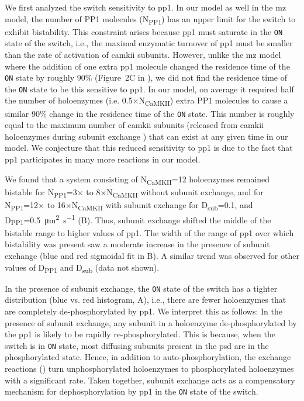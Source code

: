 \documentclass[9pt,lineno,doublespacing]{elife}
\newcommand\SUB[2]{#1\textsubscript{#2}}
\begin{document}
We first analyzed the switch sensitivity to \gls{pp1}. In our model as well in
the \gls{mz} model, the number of PP1 molecules (\SUB{N}{PP1}) has an upper
limit for the switch to exhibit bistability. This constraint arises because
\gls{pp1} must saturate in the \texttt{ON} state of the switch, i.e., the
maximal enzymatic turnover of \gls{pp1} must be smaller than the rate of
activation of \gls{camkii} subunits. However, unlike the \gls{mz} model where
the addition of one extra \gls{pp1} molecule changed the residence time of the
\texttt{ON} state by roughly 90\% (Figure~2C in \cite{miller_stability_2005}),
we did not find the residence time of the \texttt{ON} state to be this sensitive
to \gls{pp1}. In our model, on average it required half the number of
holoenzymes (i.e. 0.5×\SUB{N}{CaMKII}) extra PP1 molecules to cause a similar
90\% change in the residence time of the \texttt{ON} state.  This number is
roughly equal to the maximum number of \gls{camkii} subunits (released from
\gls{camkii} holoenzymes during subunit exchange ) that can exist
at any given time in our model. We conjecture that this reduced sensitivity to
\gls{pp1} is due to the fact that \gls{pp1} participates in many more reactions
in our model. 

We found that a system consisting of \SUB{N}{CaMKII}=12 holoenzymes remained
bistable for \SUB{N}{PP1}=3$\times$ to 8$\times$\SUB{N}{CaMKII} without subunit
exchange, and for \SUB{N}{PP1}=12$\times$ to 16$\times$\SUB{N}{CaMKII} with
subunit exchange for \SUB{D}{sub}=0.1, and
\SUB{D}{PP1}=\SI{0.5}{\micro\meter\squared\per\second} (B).
Thus, subunit exchange shifted the middle of the bistable range to higher values
of \gls{pp1}. The width of the range of \gls{pp1} over which bistability was
present saw a moderate increase in the presence of subunit exchange (blue and
red sigmoidal fit in B). A similar trend was observed for
other values of \SUB{D}{PP1} and \SUB{D}{sub} (data not shown).

In the presence of subunit exchange, the \texttt{ON} state of the switch has a
tighter distribution (blue vs. red histogram, A), i.e., there
are fewer holoenzymes that are completely de-phosphorylated by \gls{pp1}. We
interpret this as follows: In the presence of subunit exchange, any subunit in a
holoenzyme de-phosphorylated by the \gls{pp1} is likely to be rapidly
re-phosphorylated. This is because, when the switch is in \texttt{ON} state,
most diffusing subunits present in the \gls{psd} are in the phosphorylated
state. Hence, in addition to auto-phosphorylation, the exchange reactions
() turn unphosphorylated holoenzymes to phosphorylated holoenzymes
with a significant rate. Taken together, subunit exchange acts as a compensatory
mechanism for dephosphorylation by \gls{pp1} in the \texttt{ON} state of the
switch.
\end{document}
